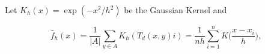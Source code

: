 Let  $K_h(x) = \exp( -x^2/h^2)$ be the Gaussian Kernel and

\[
    \hat{f}_h(x) = \frac{1}{|A|}\sum_{ y \in A} K_h (T_d(x,y)i) = \frac{1}{nh} \sum_{i=1}^n K\Big(\frac{x-x_i}{h}\Big),
  \]